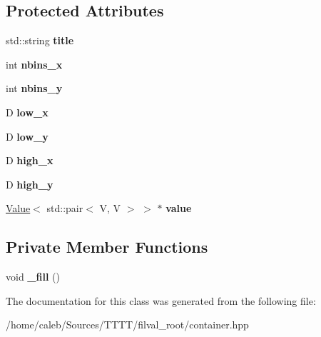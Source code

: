 \subsection*{Protected Attributes}
\begin{DoxyCompactItemize}
\item 
\hypertarget{classfv_1_1root_1_1ContainerTH2_ab3abaab718577d0ff5d5ea159865abde}{}\label{classfv_1_1root_1_1ContainerTH2_ab3abaab718577d0ff5d5ea159865abde} 
std\+::string {\bfseries title}
\item 
\hypertarget{classfv_1_1root_1_1ContainerTH2_a1ca7024c8e83d685c512aacba09f014c}{}\label{classfv_1_1root_1_1ContainerTH2_a1ca7024c8e83d685c512aacba09f014c} 
int {\bfseries nbins\+\_\+x}
\item 
\hypertarget{classfv_1_1root_1_1ContainerTH2_aa8d7eda9cb6499fa58bbace45e66cd09}{}\label{classfv_1_1root_1_1ContainerTH2_aa8d7eda9cb6499fa58bbace45e66cd09} 
int {\bfseries nbins\+\_\+y}
\item 
\hypertarget{classfv_1_1root_1_1ContainerTH2_a5c9f679947c3898ec87ab0d08b03f9cd}{}\label{classfv_1_1root_1_1ContainerTH2_a5c9f679947c3898ec87ab0d08b03f9cd} 
D {\bfseries low\+\_\+x}
\item 
\hypertarget{classfv_1_1root_1_1ContainerTH2_a377d3d7e8f0a83c8b95a8deb85c1d75a}{}\label{classfv_1_1root_1_1ContainerTH2_a377d3d7e8f0a83c8b95a8deb85c1d75a} 
D {\bfseries low\+\_\+y}
\item 
\hypertarget{classfv_1_1root_1_1ContainerTH2_a000b6a2036b6e55dfe37b037802ca9cb}{}\label{classfv_1_1root_1_1ContainerTH2_a000b6a2036b6e55dfe37b037802ca9cb} 
D {\bfseries high\+\_\+x}
\item 
\hypertarget{classfv_1_1root_1_1ContainerTH2_a7e3f8be46428572f464383c9f8c01760}{}\label{classfv_1_1root_1_1ContainerTH2_a7e3f8be46428572f464383c9f8c01760} 
D {\bfseries high\+\_\+y}
\item 
\hypertarget{classfv_1_1root_1_1ContainerTH2_a7912a4979605432d6e34d2f509d41445}{}\label{classfv_1_1root_1_1ContainerTH2_a7912a4979605432d6e34d2f509d41445} 
\hyperlink{classfv_1_1Value}{Value}$<$ std\+::pair$<$ V, V $>$ $>$ $\ast$ {\bfseries value}
\end{DoxyCompactItemize}
\subsection*{Private Member Functions}
\begin{DoxyCompactItemize}
\item 
\hypertarget{classfv_1_1root_1_1ContainerTH2_af46f002830001dc66ce4b586d682e718}{}\label{classfv_1_1root_1_1ContainerTH2_af46f002830001dc66ce4b586d682e718} 
void {\bfseries \+\_\+fill} ()
\end{DoxyCompactItemize}


The documentation for this class was generated from the following file\+:\begin{DoxyCompactItemize}
\item 
/home/caleb/\+Sources/\+T\+T\+T\+T/filval\+\_\+root/container.\+hpp\end{DoxyCompactItemize}

